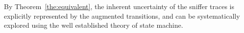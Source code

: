By Theorem~\ref{the:equivalent}, the inherent uncertainty of the sniffer traces
is explicitly represented by the augmented transitions, and can be
systematically explored using the well established theory of state machine.

